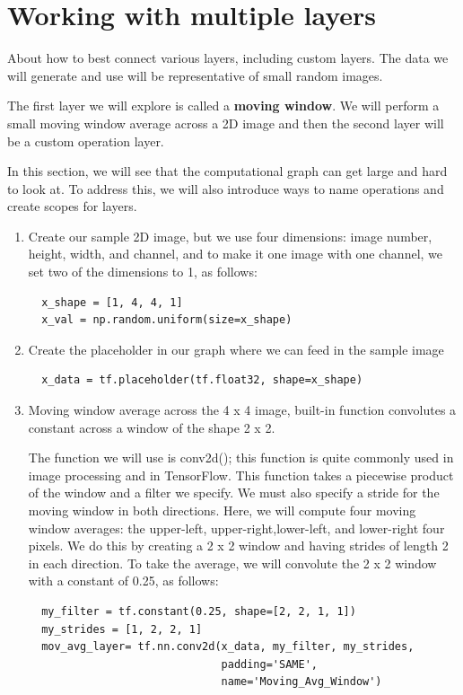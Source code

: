 \documentclass{article}
\begin{document}
\section{Working with multiple layers}
About how to best connect various layers, including custom layers. The data we will generate and use will be representative of small random images.

The first layer we will explore is called a \textbf{moving window}. We will perform a small moving window average across a 2D image and then the second layer will be a custom operation layer.

In this section, we will see that the computational graph can get large and hard to look at. To address this, we will also introduce ways to name operations and create scopes for layers.


\begin{enumerate}
  \item Create our sample 2D image, but we use four dimensions: image number, height, width, and channel, and to make it one image with one channel, we set two of the dimensions to 1, as follows:
  \begin{lstlisting}
  x_shape = [1, 4, 4, 1]
  x_val = np.random.uniform(size=x_shape)
  \end{lstlisting}

  \item Create the placeholder in our graph where we can feed in the sample image
  \begin{lstlisting}
  x_data = tf.placeholder(tf.float32, shape=x_shape)
  \end{lstlisting}

  \item Moving window average across the 4 x 4 image, built-in function convolutes a constant across a window of the shape 2 x 2.

  The function we will use is conv2d(); this function is quite commonly used in image processing and in TensorFlow. This function takes a piecewise product of the window and a filter we specify. We must also specify a stride for the moving window in both directions. Here, we will compute four moving window averages: the upper-left, upper-right,lower-left, and lower-right four pixels. We do this by creating a 2 x 2 window and having strides of length 2 in each direction. To take the average, we will convolute the 2 x 2 window with a constant of 0.25, as follows:
  \begin{lstlisting}
  my_filter = tf.constant(0.25, shape=[2, 2, 1, 1])
  my_strides = [1, 2, 2, 1]
  mov_avg_layer= tf.nn.conv2d(x_data, my_filter, my_strides,
                              padding='SAME',
                              name='Moving_Avg_Window')
  \end{lstlisting}


\end{enumerate}
\end{document}

